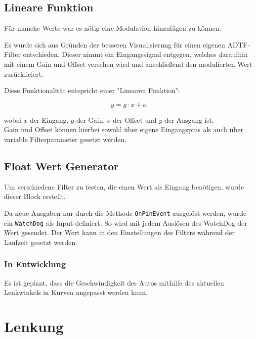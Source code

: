 \documentclass[a4paper,12pt]{report}
\begin{document}
\section{Lineare Funktion}


	Für manche Werte war es nötig eine Modulation hinzufügen zu können.

	Es wurde sich aus Gründen der besseren Visualisierung für einen eigenen ADTF-Filter entschieden.
	Dieser nimmt ein Eingangssignal entgegen, welches daraufhin mit einem Gain und Offset versehen wird und anschließend den modulierten Wert zurückliefert.

	Diese Funktionalität entspricht einer "Linearen Funktion":

	\[y = g \cdot x + o\]

	wobei $x$ der Eingang, $g$ der Gain, $o$ der Offset und $y$ der Ausgang ist.
	\\
	Gain und Offset können hierbei sowohl über eigene Eingangspins als auch über variable Filterparameter gesetzt werden.


\section{Float Wert Generator}

	Um verschiedene Filter zu testen, die einen Wert als Eingang benötigen, wurde dieser Block erstellt.

	Da neue Ausgaben nur durch die Methode \texttt{OnPinEvent} ausgelöst werden, wurde ein \texttt{WatchDog} als Input definiert. So wird mit jedem Auslösen des WatchDog der Wert gesendet. Der Wert kann in den Einstellungen des Filters während der Laufzeit gesetzt werden.


\subsection{In Entwicklung}

	Es ist geplant, dass die Geschwindigkeit des Autos mithilfe des aktuellen Lenkwinkels in Kurven angepasst werden kann.

\chapter{Lenkung}
\end{document}
